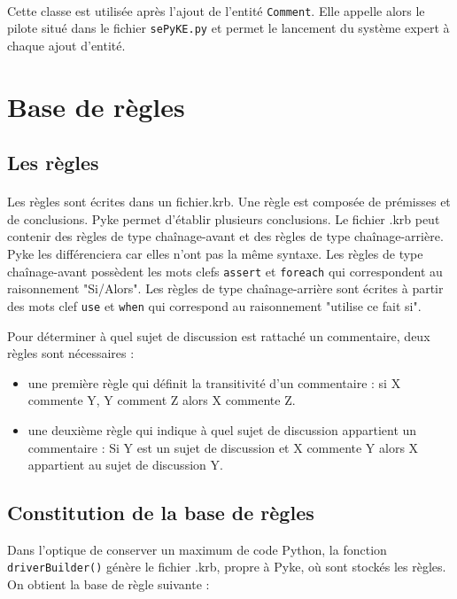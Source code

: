 \documentclass {report}
\begin{document}
\paragraph{}
Cette classe est utilisée après l'ajout de l'entité \verb+Comment+. Elle appelle alors le pilote situé dans le fichier \verb+sePyKE.py+ et permet le lancement du système expert à chaque ajout d'entité.
\section{Base de règles}

\subsection{Les règles}
\paragraph{}
Les règles sont écrites dans un fichier.krb. Une règle est composée de prémisses et de conclusions. Pyke permet d'établir plusieurs conclusions. Le fichier .krb peut contenir des règles de type chaînage-avant et des règles de type chaînage-arrière. Pyke les différenciera car elles n'ont pas la même syntaxe. Les règles de type chaînage-avant possèdent les mots clefs \verb+assert+ et \verb+foreach+ qui correspondent au raisonnement "Si/Alors". Les règles de type chaînage-arrière sont écrites à partir des mots clef \verb+use+ et \verb+when+ qui correspond au raisonnement "utilise ce fait si".


Pour déterminer à quel sujet de discussion est rattaché un commentaire, deux règles sont nécessaires :
\begin{itemize}
\item une première règle qui définit la transitivité d'un commentaire : si X commente Y, Y comment Z alors X commente Z. 
\item une deuxième règle qui indique à quel sujet de discussion appartient un commentaire : Si Y est un sujet de discussion et X commente Y alors X appartient au sujet de discussion Y.
\end{itemize}


\subsection{Constitution de la base de règles}
Dans l'optique de conserver un maximum de code Python, la fonction \verb+driverBuilder()+ génère le fichier .krb, propre à Pyke, où sont stockés les règles. On obtient la base de règle suivante :
\end{document}
